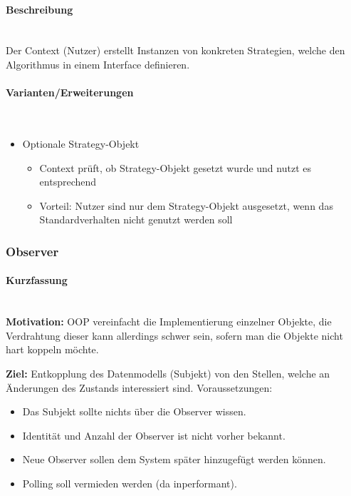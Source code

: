 \documentclass[ngerman]{tuda_summary}
\begin{document}
\paragraph{Beschreibung}\mbox{}\\
Der Context (Nutzer) erstellt Instanzen von konkreten Strategien, welche den Algorithmus in einem Interface definieren.

\paragraph{Varianten/Erweiterungen}\mbox{}\\
\begin{itemize}
    \item Optionale Strategy-Objekt
          \begin{itemize}
              \item Context prüft, ob Strategy-Objekt gesetzt wurde und nutzt es entsprechend
              \item Vorteil: Nutzer sind nur dem Strategy-Objekt ausgesetzt, wenn das Standardverhalten nicht genutzt werden soll
          \end{itemize}
\end{itemize}

\subsubsection{Observer}
\paragraph{Kurzfassung}\mbox{}\\
\textbf{Motivation:} OOP vereinfacht die Implementierung einzelner Objekte, die Verdrahtung dieser kann allerdings schwer sein, sofern man die Objekte nicht hart koppeln möchte.

\textbf{Ziel:} Entkopplung des Datenmodells (Subjekt) von den Stellen, welche an Änderungen des Zustands interessiert sind. Voraussetzungen:
\begin{itemize}
    \item Das Subjekt sollte nichts über die Observer wissen.
    \item Identität und Anzahl der Observer ist nicht vorher bekannt.
    \item Neue Observer sollen dem System später hinzugefügt werden können.
    \item Polling soll vermieden werden (da inperformant).
\end{itemize}
\end{document}
